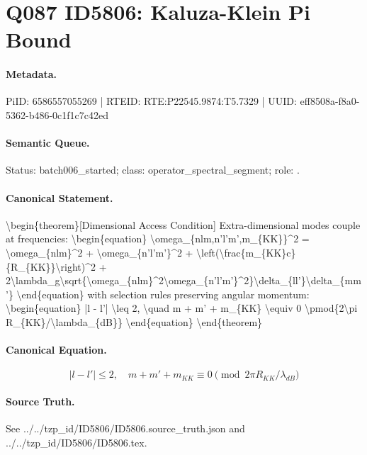 \section*{Q087 ID5806: Kaluza-Klein Pi Bound}
\paragraph{Metadata.}
PiID: 6586557055269 | RTEID: RTE:P22545.9874:T5.7329 | UUID: eff8508a-f8a0-5362-b486-0c1f1c7c42ed

\paragraph{Semantic Queue.}
Status: batch006\_started; class: operator\_spectral\_segment; role: .

\paragraph{Canonical Statement.}
\textbackslash{}begin\{theorem\}[Dimensional Access Condition] Extra-dimensional modes couple at frequencies: \textbackslash{}begin\{equation\} \textbackslash{}omega\_\{nlm,n'l'm',m\_\{KK\}\}\textasciicircum{}2 = \textbackslash{}omega\_\{nlm\}\textasciicircum{}2 + \textbackslash{}omega\_\{n'l'm'\}\textasciicircum{}2 + \textbackslash{}left(\textbackslash{}frac\{m\_\{KK\}c\}\{R\_\{KK\}\}\textbackslash{}right)\textasciicircum{}2 + 2\textbackslash{}lambda\_g\textbackslash{}sqrt\{\textbackslash{}omega\_\{nlm\}\textasciicircum{}2\textbackslash{}omega\_\{n'l'm'\}\textasciicircum{}2\}\textbackslash{}delta\_\{ll'\}\textbackslash{}delta\_\{mm'\} \textbackslash{}end\{equation\} with selection rules preserving angular momentum: \textbackslash{}begin\{equation\} |l - l'| \textbackslash{}leq 2, \textbackslash{}quad m + m' + m\_\{KK\} \textbackslash{}equiv 0 \textbackslash{}pmod\{2\textbackslash{}pi R\_\{KK\}/\textbackslash{}lambda\_\{dB\}\} \textbackslash{}end\{equation\} \textbackslash{}end\{theorem\}

\paragraph{Canonical Equation.}
\[
\begin{equation} |l - l'| \leq 2, \quad m + m' + m_{KK} \equiv 0 \pmod{2\pi R_{KK}/\lambda_{dB}} \end{equation}
\]

\paragraph{Source Truth.}
See ../../tzp\_id/ID5806/ID5806.source\_truth.json and ../../tzp\_id/ID5806/ID5806.tex.
